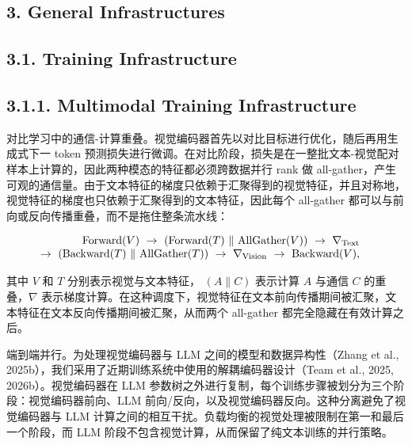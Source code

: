 \subsection{3. General Infrastructures}\label{general-infrastructures}

\subsection{3.1. Training Infrastructure}\label{training-infrastructure}

\subsection{3.1.1. Multimodal Training Infrastructure}\label{multimodal-training-infrastructure}

对比学习中的通信-计算重叠。视觉编码器首先以对比目标进行优化，随后再用生成式下一 token 预测损失进行微调。在对比阶段，损失是在一整批文本-视觉配对样本上计算的，因此两种模态的特征都必须跨数据并行 rank 做 all-gather，产生可观的通信量。由于文本特征的梯度只依赖于汇聚得到的视觉特征，并且对称地，视觉特征的梯度也只依赖于汇聚得到的文本特征，因此每个 all-gather 都可以与前向或反向传播重叠，而不是拖住整条流水线：

\[
\begin{array} { r l } { \mathrm { F o r w a r d } ( V ) ~ \to ~ \left( \mathrm { F o r w a r d } ( T ) ~ \lVert ~ \mathrm { A l l G a t h e r } ( V ) \right) ~ \to ~ \nabla _ { \mathrm { T e x t } } } & { } \\ { \to ~ \left( \mathrm { B a c k w a r d } ( T ) ~ \lVert ~ \mathrm { A l l G a t h e r } ( T ) \right) ~ \to ~ \nabla _ { \mathrm { V i s i o n } } ~ \to ~ \mathrm { B a c k w a r d } ( V ) , } \end{array}
\]

其中 $V$ 和 $T$ 分别表示视觉与文本特征，
\(\left( A \parallel C \right)\) 表示计算 $A$ 与通信 \(C\) 的重叠，$\nabla$ 表示梯度计算。在这种调度下，视觉特征在文本前向传播期间被汇聚，文本特征在文本反向传播期间被汇聚，从而两个 all-gather 都完全隐藏在有效计算之后。



端到端并行。为处理视觉编码器与 LLM 之间的模型和数据异构性（Zhang et al., 2025b），我们采用了近期训练系统中使用的解耦编码器设计（Team et al., 2025, 2026b）。视觉编码器在 LLM 参数树之外进行复制，每个训练步骤被划分为三个阶段：视觉编码器前向、LLM 前向/反向，以及视觉编码器反向。这种分离避免了视觉编码器与 LLM 计算之间的相互干扰。负载均衡的视觉处理被限制在第一和最后一个阶段，而 LLM 阶段不包含视觉计算，从而保留了纯文本训练的并行策略。

